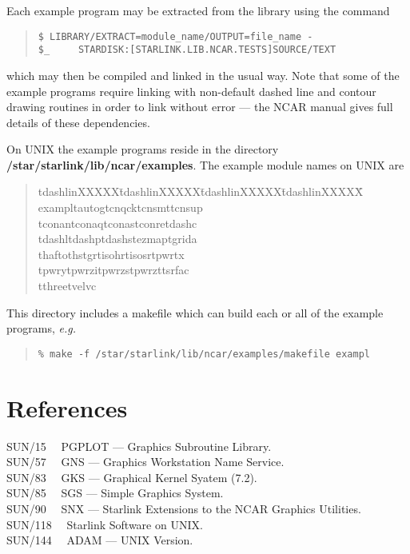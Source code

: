 Each example program may be extracted from the
library using the command

\begin{quote}
\begin{verbatim}
$ LIBRARY/EXTRACT=module_name/OUTPUT=file_name -
$_     STARDISK:[STARLINK.LIB.NCAR.TESTS]SOURCE/TEXT
\end{verbatim}
\end{quote}

which may then be compiled and linked in the usual way.
Note that some of the example programs require linking with non-default dashed
line and contour drawing routines in order to link without error --- the NCAR 
manual gives full details of these dependencies.

\begin{sloppypar}
On UNIX the example programs reside in the directory {\bf
/star/\-starlink/\-lib/\-ncar/\-examples}.
The example module names on UNIX are 
\end{sloppypar}

\begin{quote}
\begin{tabbing}
tdashlinXXXXX\=tdashlinXXXXX\=tdashlinXXXXX\=tdashlinXXXXX\=\kill
exampl\>tautog\>tcnqck\>tcnsmt\>tcnsup\\
tconan\>tconaq\>tconas\>tconre\>tdashc\\
tdashl\>tdashp\>tdashs\>tezmap\>tgrida\\
thafto\>thstgr\>tisohr\>tisosr\>tpwrtx\\
tpwry\>tpwrzi\>tpwrzs\>tpwrzt\>tsrfac\\
tthree\>tvelvc
\end{tabbing}
\end{quote}

This directory includes a makefile which can build each or all of the 
example programs, {\em e.g.}

\begin{quote}
\begin{verbatim}
% make -f /star/starlink/lib/ncar/examples/makefile exampl
\end{verbatim}
\end{quote}


\section{References}

SUN/15 ~~PGPLOT --- Graphics Subroutine Library.\\
SUN/57 ~~GNS --- Graphics Workstation Name Service.\\
SUN/83 ~~GKS --- Graphical Kernel Syatem (7.2).\\
SUN/85 ~~SGS --- Simple Graphics System.\\
SUN/90 ~~SNX --- Starlink Extensions to the NCAR Graphics Utilities.\\
SUN/118 ~~Starlink Software on UNIX.\\
SUN/144 ~~ADAM --- UNIX Version.\\


